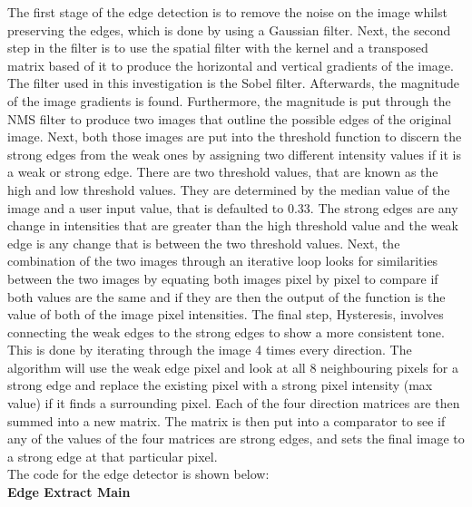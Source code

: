 \documentclass{article}
\begin{document}
	The first stage of the edge detection is to remove the noise on the image whilst preserving the edges, which is done by using a Gaussian filter. Next, the second step in the filter is to use the spatial filter with the kernel and a transposed matrix based of it to produce the horizontal and vertical gradients of the image. The filter used in this investigation is the Sobel filter. Afterwards, the magnitude of the image gradients is found. Furthermore, the magnitude is put through the NMS filter to produce two images that outline the possible edges of the original image. Next, both those images are put into the threshold function to discern the strong edges from the weak ones by assigning two different intensity values if it is a weak or strong edge. There are two threshold values, that are known as the high and low threshold values. They are determined by the median value of the image and a user input value, that is defaulted to 0.33. The strong edges are any change in intensities that are greater than the high threshold value and the weak edge is any change that is between the two threshold values. Next, the combination of the two images through an iterative loop looks for similarities between the two images by equating both images pixel by pixel to compare if both values are the same and if they are then the output of the function is the value of both of the image pixel intensities. The final step, Hysteresis, involves connecting the weak edges to the strong edges to show a more consistent tone. This is done by iterating through the image 4 times every direction. The algorithm will use the weak edge pixel and look at all 8 neighbouring pixels for a strong edge and replace the existing pixel with a strong pixel intensity (max value) if it finds a surrounding pixel. Each of the four direction matrices are then summed into a new matrix. The matrix is then put into a comparator to see if any of the values of the four matrices are strong edges, and sets the final image to a strong edge at that particular pixel.\\
	
	\noindent The code for the edge detector is shown below:\\
	
	\noindent \textbf{Edge Extract Main}
	
	\smallskip
	
\end{document}
